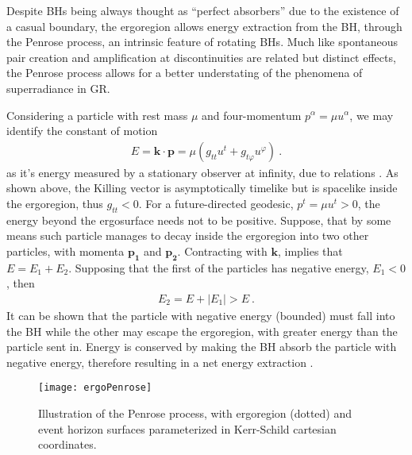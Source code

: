 Despite BHs being always thought as ``perfect absorbers'' due to the existence of a casual boundary, the ergoregion allows energy extraction from the BH, through the Penrose process, an intrinsic feature of rotating BHs.
Much like spontaneous pair creation and amplification at discontinuities are related but distinct effects, the Penrose process allows for a better understating of the phenomena of superradiance in GR. 

Considering a particle with rest mass $\mu$ and four-momentum $p^\alpha = \mu u^\alpha$, we may identify the constant of motion 
\begin{align}
    E = \bm{k} \cdot \bm{p} = \mu ( g_{tt} u^t + g_{t\varphi} u^\varphi ) ~.
    \label{eq2:PenroseE0}
\end{align}
as it's energy measured by a stationary observer at infinity, due to relations .
As shown above, the Killing vector is asymptotically timelike but is spacelike inside the ergoregion, thus $g_{tt}<0$.
For a future-directed geodesic, $p^t = \mu u^t > 0$, the energy beyond the ergosurface needs not to be positive.
Suppose, that by some means such particle manages to decay inside the ergoregion into two other particles, with momenta $\bm{p_1}$ and $\bm{p_2}$. Contracting with $\bm{k}$, implies that $E = E_1+E_2$. Supposing that the first of the particles has negative energy, $E_1<0$, then 
\begin{align}
    E_2 = E + |E_1| > E ~.
    \label{eq2:PenroseE2}
\end{align}
It can be shown that the particle with negative energy (bounded) must fall into the BH while the other may escape the ergoregion, with greater energy than the particle sent in. 
Energy is conserved by making the BH absorb the particle with negative energy, therefore resulting in a net energy extraction \cite{Townsend1997}.

\begin{figure}[h]
    \centering
    \vspace{0.2cm}
    \texttt{[image: ergoPenrose]}
    \caption{Illustration of the Penrose process, with ergoregion (dotted) and event horizon surfaces parameterized in Kerr-Schild cartesian coordinates.}
    \label{fig2:penroseProcess}
\end{figure}


